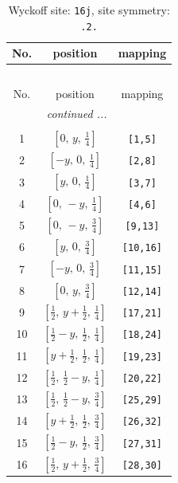\documentclass[fleqn,8pt]{jsarticle}
\begin{document}
\renewcommand{\arraystretch}{1.2}
\begin{longtable}{ccc}
\caption{Wyckoff site: {\tt 16j}, site symmetry: {\tt .2.}}
 \\
 \hline \hline
No. & position & mapping \\ \hline \endfirsthead

\multicolumn{2}{l}{\tablename\ \thetable{}} \\
 \hline \hline
No. & position & mapping \\ \hline \endhead

 \hline \hline
\multicolumn{2}{r}{\footnotesize\it continued ...} \\ \endfoot

 \hline \hline
\multicolumn{2}{r}{} \\ \endlastfoot

1 & $\left[ 0,\, y,\, \frac{1}{4} \right]$ & {\tt [1,5]} \\ \hline
2 & $\left[ - y,\, 0,\, \frac{1}{4} \right]$ & {\tt [2,8]} \\ \hline
3 & $\left[ y,\, 0,\, \frac{1}{4} \right]$ & {\tt [3,7]} \\ \hline
4 & $\left[ 0,\, - y,\, \frac{1}{4} \right]$ & {\tt [4,6]} \\ \hline
5 & $\left[ 0,\, - y,\, \frac{3}{4} \right]$ & {\tt [9,13]} \\ \hline
6 & $\left[ y,\, 0,\, \frac{3}{4} \right]$ & {\tt [10,16]} \\ \hline
7 & $\left[ - y,\, 0,\, \frac{3}{4} \right]$ & {\tt [11,15]} \\ \hline
8 & $\left[ 0,\, y,\, \frac{3}{4} \right]$ & {\tt [12,14]} \\ \hline
9 & $\left[ \frac{1}{2},\, y + \frac{1}{2},\, \frac{1}{4} \right]$ & {\tt [17,21]} \\ \hline
10 & $\left[ \frac{1}{2} - y,\, \frac{1}{2},\, \frac{1}{4} \right]$ & {\tt [18,24]} \\ \hline
11 & $\left[ y + \frac{1}{2},\, \frac{1}{2},\, \frac{1}{4} \right]$ & {\tt [19,23]} \\ \hline
12 & $\left[ \frac{1}{2},\, \frac{1}{2} - y,\, \frac{1}{4} \right]$ & {\tt [20,22]} \\ \hline
13 & $\left[ \frac{1}{2},\, \frac{1}{2} - y,\, \frac{3}{4} \right]$ & {\tt [25,29]} \\ \hline
14 & $\left[ y + \frac{1}{2},\, \frac{1}{2},\, \frac{3}{4} \right]$ & {\tt [26,32]} \\ \hline
15 & $\left[ \frac{1}{2} - y,\, \frac{1}{2},\, \frac{3}{4} \right]$ & {\tt [27,31]} \\ \hline
16 & $\left[ \frac{1}{2},\, y + \frac{1}{2},\, \frac{3}{4} \right]$ & {\tt [28,30]} \\
\end{longtable}
\end{document}
